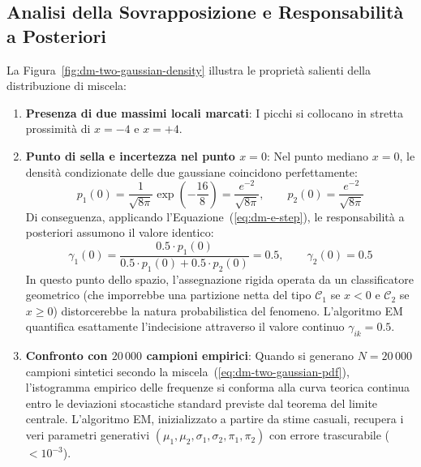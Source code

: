 \FloatBarrier
\subsection{Analisi della Sovrapposizione e Responsabilità a Posteriori}

La Figura~\ref{fig:dm-two-gaussian-density} illustra le proprietà salienti della distribuzione di miscela:
\begin{enumerate}
    \item \textbf{Presenza di due massimi locali marcati}: I picchi si collocano in stretta prossimità di $x = -4$ e $x = +4$.
    \item \textbf{Punto di sella e incertezza nel punto $x = 0$}: Nel punto mediano $x = 0$, le densità condizionate delle due gaussiane coincidono perfettamente:
    \begin{equation}
    p_1(0) = \frac{1}{\sqrt{8\pi}} \exp\left(-\frac{16}{8}\right) = \frac{e^{-2}}{\sqrt{8\pi}}, \qquad p_2(0) = \frac{e^{-2}}{\sqrt{8\pi}}
    \end{equation}
    Di conseguenza, applicando l'Equazione~(\ref{eq:dm-e-step}), le responsabilità a posteriori assumono il valore identico:
    \begin{equation}
    \gamma_{1}(0) = \frac{0.5 \cdot p_1(0)}{0.5 \cdot p_1(0) + 0.5 \cdot p_2(0)} = 0.5, \qquad \gamma_{2}(0) = 0.5
    \end{equation}
    In questo punto dello spazio, l'assegnazione rigida operata da un classificatore geometrico (che imporrebbe una partizione netta del tipo $\mathcal{C}_1$ se $x < 0$ e $\mathcal{C}_2$ se $x \ge 0$) distorcerebbe la natura probabilistica del fenomeno. L'algoritmo EM quantifica esattamente l'indecisione attraverso il valore continuo $\gamma_{ik} = 0.5$.
    \item \textbf{Confronto con $20\,000$ campioni empirici}: Quando si generano $N = 20\,000$ campioni sintetici secondo la miscela~(\ref{eq:dm-two-gaussian-pdf}), l'istogramma empirico delle frequenze si conforma alla curva teorica continua entro le deviazioni stocastiche standard previste dal teorema del limite centrale. L'algoritmo EM, inizializzato a partire da stime casuali, recupera i veri parametri generativi $(\mu_1, \mu_2, \sigma_1, \sigma_2, \pi_1, \pi_2)$ con errore trascurabile ($< 10^{-3}$).
\end{enumerate}

\FloatBarrier
